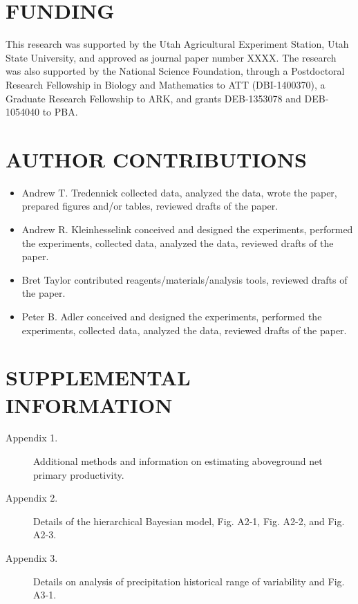 \documentclass[fleqn,10pt,lineno]{wlpeerj} %
\begin{document}
\section{FUNDING}\label{funding}

This research was supported by the Utah Agricultural Experiment Station,
Utah State University, and approved as journal paper number XXXX. The
research was also supported by the National Science Foundation, through
a Postdoctoral Research Fellowship in Biology and Mathematics to ATT
(DBI-1400370), a Graduate Research Fellowship to ARK, and grants
DEB-1353078 and DEB-1054040 to PBA.

\section{AUTHOR CONTRIBUTIONS}\label{author-contributions}

\begin{itemize}
  \item Andrew T. Tredennick collected data, analyzed the data, wrote the paper, prepared figures and/or tables, reviewed drafts of the paper.
  \item Andrew R. Kleinhesselink conceived and designed the experiments, performed the experiments, collected data, analyzed the data, reviewed drafts of the paper.
  \item Bret Taylor contributed reagents/materials/analysis tools, reviewed drafts of the paper.
  \item Peter B. Adler conceived and designed the experiments, performed the experiments, collected data, analyzed the data, reviewed drafts of the paper.
\end{itemize}

\section{SUPPLEMENTAL INFORMATION}\label{supplemental-information}

\begin{description}
\item [Appendix 1.] Additional methods and information on estimating aboveground net primary productivity.
\item [Appendix 2.] Details of the hierarchical Bayesian model, Fig. A2-1, Fig. A2-2, and Fig. A2-3.
\item [Appendix 3.] Details on analysis of precipitation historical range of variability and Fig. A3-1.
\end{description}
\end{document}
